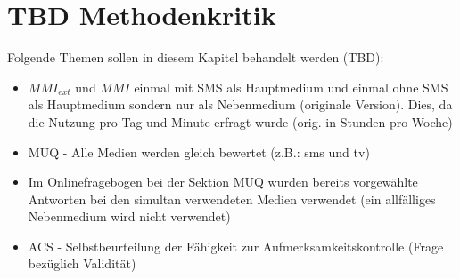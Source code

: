 \section{TBD Methodenkritik}\label{section.diskussion.methodenkritik}
Folgende Themen sollen in diesem Kapitel behandelt werden (TBD):
\begin{itemize}
    \item $MMI_{ext}$ und $MMI$ einmal mit SMS als Hauptmedium und einmal ohne SMS als Hauptmedium sondern nur als Nebenmedium (originale Version). Dies, da die Nutzung pro Tag und Minute erfragt wurde (orig. in Stunden pro Woche)
    \item MUQ - Alle Medien werden gleich bewertet (z.B.: sms und tv)
    \item Im Onlinefragebogen bei der Sektion MUQ wurden bereits vorgewählte Antworten bei den simultan verwendeten Medien verwendet (ein allfälliges Nebenmedium wird nicht verwendet)
    \item ACS - Selbstbeurteilung der Fähigkeit zur Aufmerksamkeitskontrolle (Frage bezüglich Validität)
\end{itemize}


